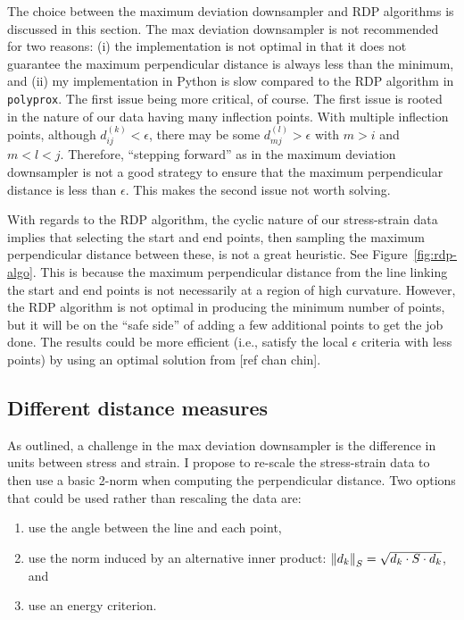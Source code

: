 \documentclass[a4paper,11pt]{article}
\begin{document}
The choice between the maximum deviation downsampler and RDP algorithms is discussed in this section.
The max deviation downsampler is not recommended for two reasons:
(i) the implementation is not optimal in that it does not guarantee the maximum perpendicular distance is always less than the minimum, and (ii) my implementation in Python is slow compared to the RDP algorithm in \texttt{polyprox}.
The first issue being more critical, of course.
The first issue is rooted in the nature of our data having many inflection points.
With multiple inflection points, although $d^{(k)}_{ij} < \epsilon$, there may be some $d^{(l)}_{mj} > \epsilon$ with $m > i$ and $m < l < j$.
Therefore, ``stepping forward'' as in the maximum deviation downsampler is not a good strategy to ensure that the maximum perpendicular distance is less than $\epsilon$.
This makes the second issue not worth solving.

With regards to the RDP algorithm, the cyclic nature of our stress-strain data implies that selecting the start and end points, then sampling the maximum perpendicular distance between these, is not a great heuristic.
See Figure~\ref{fig:rdp-algo}.
This is because the maximum perpendicular distance from the line linking the start and end points is not necessarily at a region of high curvature.
However, the RDP algorithm is not optimal in producing the minimum number of points, but it will be on the ``safe side'' of adding a few additional points to get the job done.
The results could be more efficient (i.e., satisfy the local $\epsilon$ criteria with less points) by using an optimal solution from [ref chan chin].

\subsection{Different distance measures}

As outlined, a challenge in the max deviation downsampler is the difference in units between stress and strain.
I propose to re-scale the stress-strain data to then use a basic 2-norm when computing the perpendicular distance.
Two options that could be used rather than rescaling the data are:
\begin{enumerate}
    \item use the angle between the line and each point,
    \item use the norm induced by an alternative inner product: $\norm{d_k}_S = \sqrt{d_k \cdot S \cdot d_k}$, and
    \item use an energy criterion.
\end{enumerate}
\end{document}
